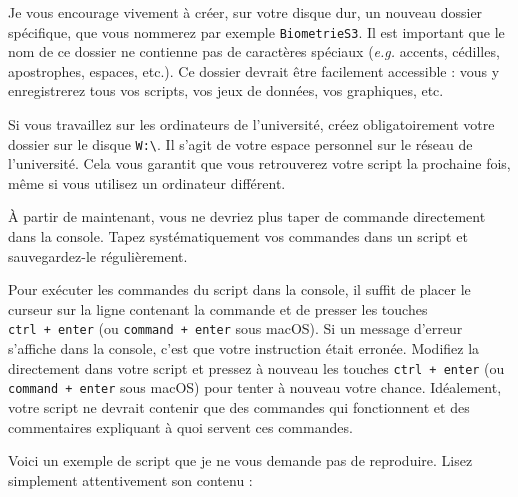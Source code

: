 \documentclass[
  a4paper,
  DIV=11,
  numbers=noendperiod,
  oneside]{scrreprt}
\begin{document}
\begin{tcolorbox}[enhanced jigsaw, coltitle=black, toprule=.15mm, opacityback=0, breakable, colback=white, opacitybacktitle=0.6, colframe=quarto-callout-important-color-frame, leftrule=.75mm, rightrule=.15mm, titlerule=0mm, bottomtitle=1mm, toptitle=1mm, arc=.35mm, title=\textcolor{quarto-callout-important-color}{\faExclamation}\hspace{0.5em}{Où sauvegarder vos scripts ? {\faIcon{save}}}, colbacktitle=quarto-callout-important-color!10!white, bottomrule=.15mm, left=2mm]

Je vous encourage vivement à créer, sur votre disque dur, un nouveau
dossier spécifique, que vous nommerez par exemple \texttt{BiometrieS3}.
Il est important que le nom de ce dossier ne contienne pas de caractères
spéciaux (\emph{e.g.} accents, cédilles, apostrophes, espaces, etc.). Ce
dossier devrait être facilement accessible : vous y enregistrerez tous
vos scripts, vos jeux de données, vos graphiques, etc.

Si vous travaillez sur les ordinateurs de l'université, créez
{obligatoirement} votre dossier sur le disque
\texttt{W:\textbackslash{}}. Il s'agit de votre espace personnel sur le
réseau de l'université. Cela vous garantit que vous retrouverez votre
script la prochaine fois, même si vous utilisez un ordinateur différent.

\end{tcolorbox}

À partir de maintenant, vous ne devriez plus taper de commande
directement dans la console. Tapez systématiquement vos commandes dans
un script et sauvegardez-le régulièrement.

Pour exécuter les commandes du script dans la console, il suffit de
placer le curseur sur la ligne contenant la commande et de presser les
touches \texttt{ctrl\ +\ enter} (ou \texttt{command\ +\ enter} sous
macOS). Si un message d'erreur s'affiche dans la console, c'est que
votre instruction était erronée. Modifiez la directement dans votre
script et pressez à nouveau les touches \texttt{ctrl\ +\ enter} (ou
\texttt{command\ +\ enter} sous macOS) pour tenter à nouveau votre
chance. Idéalement, votre script ne devrait contenir que des commandes
qui fonctionnent et des commentaires expliquant à quoi servent ces
commandes.

Voici un exemple de script que je ne vous demande pas de reproduire.
Lisez simplement attentivement son contenu :
\end{document}
